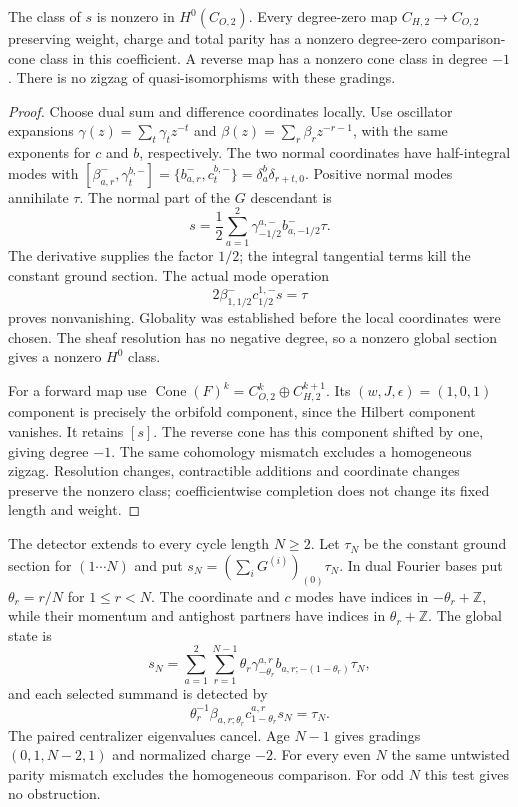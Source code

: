 \begin{proposition}\label{cyprim:prop:McKay-detector}
The class of $s$ is nonzero in $H^0(C_{O,2})$.
Every degree-zero map $C_{H,2}\to C_{O,2}$ preserving
weight, charge and total parity has a nonzero
degree-zero comparison-cone class in this coefficient.
A reverse map has a nonzero cone class in degree
$-1$. There is no zigzag of quasi-isomorphisms
with these gradings.
\end{proposition}

\begin{proof}
Choose dual sum and difference coordinates locally.
Use oscillator expansions
$\gamma(z)=\sum_t\gamma_tz^{-t}$ and
$\beta(z)=\sum_r\beta_rz^{-r-1}$, with the same
exponents for $c$ and $b$, respectively.
The two normal coordinates have half-integral modes
with
$[\beta^-_{a,r},\gamma^{b,-}_t]
=\{b^-_{a,r},c^{b,-}_t\}
=\delta_a^b\delta_{r+t,0}$.
Positive normal modes annihilate $\tau$.
The normal part of the $G$ descendant is
\[
 s=\frac12\sum_{a=1}^2
       \gamma^{a,-}_{-1/2}b^-_{a,-1/2}\tau.
\]
The derivative supplies the factor $1/2$; the
integral tangential terms kill the constant ground
section. The actual mode operation
\begin{equation}\label{cyprim:eq:McKay-detector}
 2\beta^-_{1,1/2}c^{1,-}_{1/2}s=\tau
\end{equation}
proves nonvanishing. Globality was established
before the local coordinates were chosen. The
sheaf resolution has no negative degree, so a
nonzero global section gives a nonzero $H^0$ class.

For a forward map use
$\operatorname{Cone}(F)^k=C_{O,2}^k\oplus C_{H,2}^{k+1}$.
Its $(w,J,\epsilon)=(1,0,1)$ component is precisely
the orbifold component, since the Hilbert component
vanishes. It retains $[s]$. The reverse cone has
this component shifted by one, giving degree $-1$.
The same cohomology mismatch excludes a homogeneous
zigzag. Resolution changes, contractible additions
and coordinate changes preserve the nonzero class;
coefficientwise completion does not change its
fixed length and weight.
\end{proof}

The detector extends to every cycle length $N\ge2$.
Let $\tau_N$ be the constant ground section for
$(1\cdots N)$ and put $s_N=(\sum_iG^{(i)})_{(0)}\tau_N$.
In dual Fourier bases put $\theta_r=r/N$ for
$1\le r<N$. The coordinate and $c$ modes have
indices in $-\theta_r+\mathbb Z$, while their
momentum and antighost partners have indices in
$\theta_r+\mathbb Z$. The global state is
\[
 s_N=\sum_{a=1}^2\sum_{r=1}^{N-1}\theta_r
       \gamma^{a,r}_{-\theta_r}
       b_{a,r;-(1-\theta_r)}\tau_N,
\]
and each selected summand is detected by
\[
 \theta_r^{-1}\beta_{a,r;\theta_r}
            c^{a,r}_{1-\theta_r}s_N=\tau_N.
\]
The paired centralizer eigenvalues cancel. Age
$N-1$ gives gradings $(0,1,N-2,1)$ and normalized
charge $-2$. For every even $N$ the same untwisted
parity mismatch excludes the homogeneous comparison.
For odd $N$ this test gives no obstruction.


